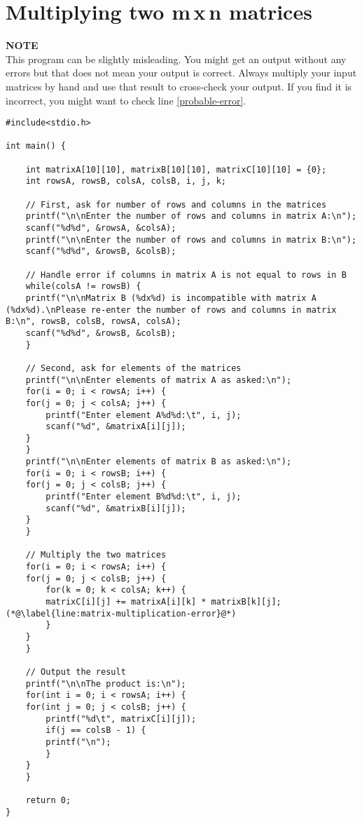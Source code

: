 \documentclass[11pt,oneside]{article}
\newcommand{\info}[1]{\textbf{\scriptsize{\sffamily\addfontfeatures{LetterSpace=7} #1\\[.35em]}}}
\begin{document}
\section{Multiplying two m\,x\,n matrices}
\begin{infobox}
\info{\MakeUppercase{Note}}
This program can be slightly misleading. You might get an output without any errors but that does not mean your output is correct. Always multiply your input matrices by hand and use that result to cross-check your output. If you find it is incorrect, you might want to check line \ref{probable-error}.
\end{infobox}
\begin{lstlisting}
#include<stdio.h>

int main() {

    int matrixA[10][10], matrixB[10][10], matrixC[10][10] = {0};
    int rowsA, rowsB, colsA, colsB, i, j, k;
    
    // First, ask for number of rows and columns in the matrices
    printf("\n\nEnter the number of rows and columns in matrix A:\n");
    scanf("%d%d", &rowsA, &colsA);
    printf("\n\nEnter the number of rows and columns in matrix B:\n");
    scanf("%d%d", &rowsB, &colsB);

    // Handle error if columns in matrix A is not equal to rows in B
    while(colsA != rowsB) {
	printf("\n\nMatrix B (%dx%d) is incompatible with matrix A (%dx%d).\nPlease re-enter the number of rows and columns in matrix B:\n", rowsB, colsB, rowsA, colsA);
	scanf("%d%d", &rowsB, &colsB);
    }

    // Second, ask for elements of the matrices
    printf("\n\nEnter elements of matrix A as asked:\n");
    for(i = 0; i < rowsA; i++) {
	for(j = 0; j < colsA; j++) {
	    printf("Enter element A%d%d:\t", i, j);
	    scanf("%d", &matrixA[i][j]);
	}
    }
    printf("\n\nEnter elements of matrix B as asked:\n");
    for(i = 0; i < rowsB; i++) {
	for(j = 0; j < colsB; j++) {
	    printf("Enter element B%d%d:\t", i, j);
	    scanf("%d", &matrixB[i][j]);
	}
    }
    
    // Multiply the two matrices
    for(i = 0; i < rowsA; i++) {
	for(j = 0; j < colsB; j++) {
	    for(k = 0; k < colsA; k++) {
		matrixC[i][j] += matrixA[i][k] * matrixB[k][j]; (*@\label{line:matrix-multiplication-error}@*)
	    }
	}
    }

    // Output the result
    printf("\n\nThe product is:\n");
    for(int i = 0; i < rowsA; i++) {
	for(int j = 0; j < colsB; j++) {
	    printf("%d\t", matrixC[i][j]);
	    if(j == colsB - 1) {
		printf("\n");
	    }
	}
    }

    return 0;
}
\end{lstlisting}
\pagebreak
%
%
\end{document}
